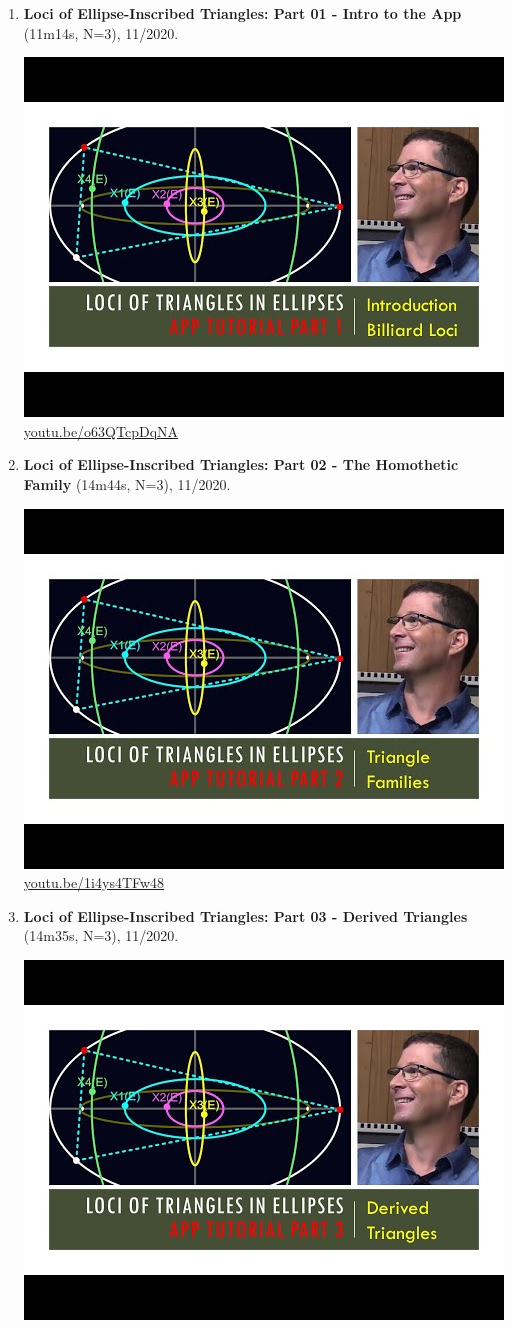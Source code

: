 \documentclass[12pt]{amsart}
\begin{document}
\begin{enumerate}[resume]
\item \textbf{Loci of Ellipse-Inscribed Triangles: Part 01 - Intro to the App} (11m14s, N=3), 11/2020. 
\begin{center}\includegraphics[width=.5\textwidth]{pics/o63QTcpDqNA.jpg} \\ 
\href{https://youtu.be/o63QTcpDqNA}{\url{youtu.be/o63QTcpDqNA}}\end{center}
% 
\item \textbf{Loci of Ellipse-Inscribed Triangles: Part 02 - The Homothetic Family} (14m44s, N=3), 11/2020. 
\begin{center}\includegraphics[width=.5\textwidth]{pics/1i4ys4TFw48.jpg} \\ 
\href{https://youtu.be/1i4ys4TFw48}{\url{youtu.be/1i4ys4TFw48}}\end{center}
% 
\item \textbf{Loci of Ellipse-Inscribed Triangles: Part 03 - Derived Triangles} (14m35s, N=3), 11/2020. 
\begin{center}\includegraphics[width=.5\textwidth]{pics/DSeZXMnuirA.jpg} \\ 

\end{center}
\end{enumerate}
\end{document}
